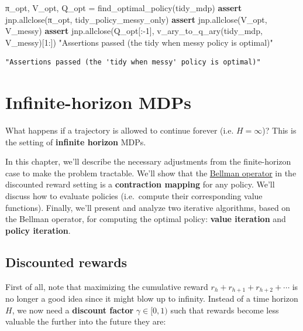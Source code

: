 \documentclass[
  letterpaper,
  DIV=11,
  numbers=noendperiod]{scrreprt}
\newenvironment{Shaded}{\begin{snugshade}}{\end{snugshade}}
\newcommand{\CommentTok}[1]{\textcolor[rgb]{0.37,0.37,0.37}{#1}}
\newcommand{\ControlFlowTok}[1]{\textcolor[rgb]{0.00,0.23,0.31}{\textbf{#1}}}
\newcommand{\DecValTok}[1]{\textcolor[rgb]{0.68,0.00,0.00}{#1}}
\newcommand{\NormalTok}[1]{\textcolor[rgb]{0.00,0.23,0.31}{#1}}
\newcommand{\OperatorTok}[1]{\textcolor[rgb]{0.37,0.37,0.37}{#1}}
\theoremstyle{plain}
\theoremstyle{plain}
\theoremstyle{definition}
\theoremstyle{definition}
\theoremstyle{remark}
\begin{document}
\begin{Shaded}
\begin{Highlighting}[]
\NormalTok{π\_opt, V\_opt, Q\_opt }\OperatorTok{=}\NormalTok{ find\_optimal\_policy(tidy\_mdp)}
\ControlFlowTok{assert}\NormalTok{ jnp.allclose(π\_opt, tidy\_policy\_messy\_only)}
\ControlFlowTok{assert}\NormalTok{ jnp.allclose(V\_opt, V\_messy)}
\ControlFlowTok{assert}\NormalTok{ jnp.allclose(Q\_opt[:}\OperatorTok{{-}}\DecValTok{1}\NormalTok{], v\_ary\_to\_q\_ary(tidy\_mdp, V\_messy)[}\DecValTok{1}\NormalTok{:])}
\CommentTok{"Assertions passed (the \textquotesingle{}tidy when messy\textquotesingle{} policy is optimal)"}
\end{Highlighting}
\end{Shaded}

\begin{verbatim}
"Assertions passed (the 'tidy when messy' policy is optimal)"
\end{verbatim}

\section{Infinite-horizon MDPs}\label{sec-infinite_horizon_mdps}

What happens if a trajectory is allowed to continue forever (i.e.
\(H = \infty\))? This is the setting of \textbf{infinite horizon} MDPs.

In this chapter, we'll describe the necessary adjustments from the
finite-horizon case to make the problem tractable. We'll show that the
\hyperref[bellman_operator]{Bellman operator} in the discounted reward
setting is a \textbf{contraction mapping} for any policy. We'll discuss
how to evaluate policies (i.e.~compute their corresponding value
functions). Finally, we'll present and analyze two iterative algorithms,
based on the Bellman operator, for computing the optimal policy:
\textbf{value iteration} and \textbf{policy iteration}.

\subsection{Discounted rewards}\label{discounted-rewards}

First of all, note that maximizing the cumulative reward
\(r_h+ r_{h+1} + r_{h+2} + \cdots\) is no longer a good idea since it
might blow up to infinity. Instead of a time horizon \(H\), we now need
a \textbf{discount factor} \(\gamma \in [0, 1)\) such that rewards
become less valuable the further into the future they are:
\end{document}
